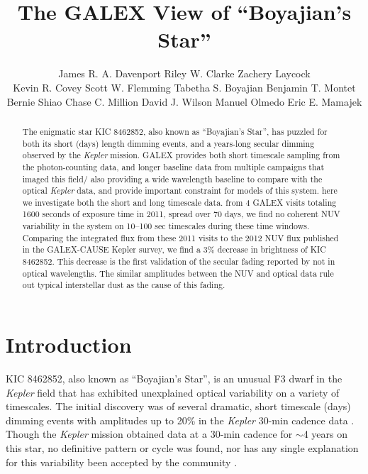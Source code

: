 \documentclass[twocolumn]{aastex6}
\newcommand{\Kepler}{\textsl{Kepler}\xspace}
\begin{document}
\title{The GALEX View of ``Boyajian's Star''}


\author{
	James R. A. Davenport
	Riley W. Clarke
	Zachery Laycock\\
	Kevin R. Covey
	Scott W. Flemming
	Tabetha S. Boyajian
	Benjamin T. Montet\\
	Bernie Shiao
	Chase C. Million
	David J. Wilson
	Manuel Olmedo
	Eric E. Mamajek
	}

 

 

\begin{abstract}
The enigmatic star KIC 8462852, also known as ``Boyajian's Star'',  has puzzled for both its short (days) length dimming events, and a years-long secular dimming observed by the \Kepler mission.
GALEX provides both short timescale sampling from the photon-counting data, and longer baseline data from multiple campaigns that imaged this field/ also providing a wide wavelength baseline to compare with the optical \Kepler data, and provide important constraint for models of this system.
here we investigate both the short and long timescale data. from 4 GALEX visits totaling 1600 seconds of exposure time in 2011, spread over 70 days, we find no coherent NUV variability in the system on 10--100 sec timescales during these time windows. Comparing the integrated flux from these 2011 visits to the 2012 NUV flux published in the GALEX-CAUSE Kepler survey, we find a 3\% decrease in brightness of KIC 8462852. This decrease is the first  validation of the secular fading reported by \citet{montet2016} not in optical wavelengths. The similar amplitudes between the NUV and optical data rule out typical interstellar dust as the cause of this fading.
\end{abstract}



\section{Introduction}
KIC 8462852, also known as ``Boyajian's Star'', is an unusual F3 dwarf in the \Kepler field that has exhibited unexplained optical variability on a variety of timescales. The initial discovery was of several dramatic, short timescale (days) dimming events with amplitudes up to 20\% in the \Kepler 30-min cadence data \citep{boyajian2015}. Though the \Kepler mission \citep{borucki2010} obtained data at a 30-min cadence for $\sim$4 years on this star, no definitive pattern or cycle was found, nor has any single explanation for this variability been accepted by the community \citep{wright2016b}.
\end{document}
